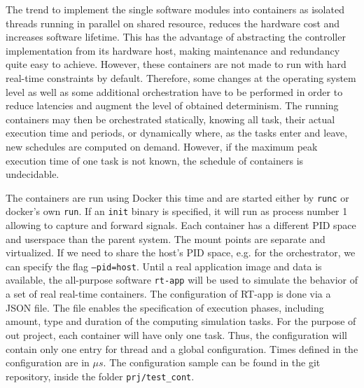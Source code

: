 \documentclass[]{scrartcl}
\begin{document}
The trend to implement the single software modules into containers as isolated threads running in parallel on shared resource, reduces the hardware cost and increases software lifetime. 
This has the advantage of abstracting the controller implementation from its hardware host, making maintenance and redundancy quite easy to achieve. %
However, these containers are not made to run with hard real-time constraints by default. Therefore, some changes at the operating system level as well as some additional orchestration have to be performed in order to reduce latencies and augment the level of obtained determinism.
The running containers may then be orchestrated statically, knowing all task, their actual execution time and periods, or dynamically where, as the tasks enter and leave, new schedules are computed on demand.
However, if the maximum peak execution time of one task is not known, the schedule of containers is undecidable. 

The containers are run using Docker this time and are started either by \texttt{runc} or docker's own \texttt{run}. 
If an \texttt{init} binary is specified, it will run as process number 1 allowing to capture and forward signals.
Each container has a different PID space and userspace than the parent system.
The mount points are separate and virtualized.
If we need to share the host's PID space, e.g. for the orchestrator, we can specify the flag \texttt{--pid=host}.
Until a real application image and data is available, the all-purpose software \texttt{rt-app} will be used to simulate the behavior of a set of real real-time containers. 
The configuration of RT-app is done via a JSON file. The file enables the specification of execution phases, including amount, type and duration of the computing simulation tasks.
For the purpose of out project, each container will have only one task. 
Thus, the configuration will contain only one entry for thread and a global configuration.
Times defined in the configuration are in $\mu s$.
The configuration sample can be found in the git repository, inside the folder \texttt{prj/test\_cont}.
\end{document}
